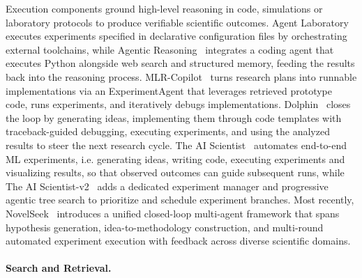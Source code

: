 Execution components ground high-level reasoning in code, simulations or laboratory protocols to produce verifiable scientific outcomes. Agent Laboratory~\cite{schmidgall2025agentlaboratoryusingllm} executes experiments specified in declarative configuration files by orchestrating external toolchains, while Agentic Reasoning~\cite{wu2025agentic} integrates a coding agent that executes Python alongside web search and structured memory, feeding the results back into the reasoning process. MLR-Copilot~\cite{li2024mlrcopilotautonomousmachinelearning} turns research plans into runnable implementations via an ExperimentAgent that leverages retrieved prototype code, runs experiments, and iteratively debugs implementations. Dolphin~\cite{yuan2025dolphin} closes the loop by generating ideas, implementing them through code templates with traceback-guided debugging, executing experiments, and using the analyzed results to steer the next research cycle. The AI Scientist~\cite{chris2024the} automates end-to-end ML experiments, i.e. generating ideas, writing code, executing experiments and visualizing results, so that observed outcomes can guide subsequent runs, while The AI Scientist-v2~\cite{yamada2025ai} adds a dedicated experiment manager and progressive agentic tree search to prioritize and schedule experiment branches. Most recently, NovelSeek~\cite{novelseekteam2025novelseekagentscientist} introduces a unified closed-loop multi-agent framework that spans hypothesis generation, idea-to-methodology construction, and multi-round automated experiment execution with feedback across diverse scientific domains.


\paragraph{Search and Retrieval.}


